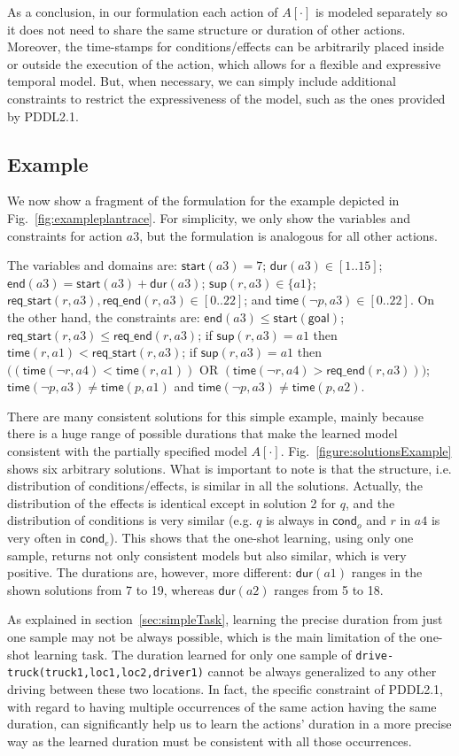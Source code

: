 \documentclass[runningheads]{llncs}
\newcommand{\cond}{\mathsf{cond}}  %
\newcommand{\dur}{\mathsf{dur}}    %
\newcommand{\start}{\mathsf{start}}%
\newcommand{\en}{\mathsf{end}}     %
\newcommand{\supp}{\mathsf{sup}}   %
\newcommand{\tim}{\mathsf{time}}   %
\newcommand{\reqs}{\mathsf{req\_{start}}} %
\newcommand{\reqe}{\mathsf{req\_{end}}}   %
\newcommand{\goal}{\mathsf{goal}}  %
\begin{document}
As a conclusion, in our formulation each action of $A[\cdot]$ is modeled separately so it does not need to share the same structure or duration of other actions. Moreover, the time-stamps for conditions/effects can be arbitrarily placed inside or outside the execution of the action, which allows for a flexible and expressive temporal model. But, when necessary, we can simply include additional constraints to restrict the expressiveness of the model, such as the ones provided by PDDL2.1.


\subsection{Example}
\label{sec:example}

We now show a fragment of the formulation for the example depicted in Fig.~\ref{fig:exampleplantrace}. For simplicity, we only show the variables and constraints for action $a3$, but the formulation is analogous for all other actions.

The variables and domains are: $\start(a3)=7$; $\dur(a3) \in [1..15]$; $\en(a3)=\start(a3)+\dur(a3)$; $\supp(r,a3) \in \{a1\}$; $\reqs(r,a3),\reqe(r,a3) \in [0..22]$; and $\tim(\neg p,a3) \in [0..22]$.
On the other hand, the constraints are: $\en(a3) \leq \start(\goal)$; $\reqs(r,a3) \leq \reqe(r,a3)$; if $\supp(r,a3)=a1$ then $\tim(r,a1) < \reqs(r,a3)$; if $\supp(r,a3)=a1$ then $((\tim(\neg r,a4) < \tim(r,a1))$ OR $(\tim(\neg r,a4) > \reqe(r,a3)))$; $\tim(\neg p,a3) \neq \tim(p,a1)$ and $\tim(\neg p,a3) \neq \tim(p,a2)$.

There are many consistent solutions for this simple example, mainly because there is a huge range of possible durations that make the learned model consistent with the partially specified model $A[\cdot]$.
Fig.~\ref{figure:solutionsExample} shows six arbitrary solutions. What is important to note is that the structure, i.e. distribution of conditions/effects, is similar in all the solutions. Actually, the distribution of the effects is identical except in solution 2 for $q$, and the distribution of conditions is very similar (e.g. $q$ is always in $\cond_o$ and $r$ in $a4$ is very often in $\cond_e$).
This shows that the one-shot learning, using only one sample, returns not only consistent models but also similar, which is very positive.
The durations are, however, more different: $\dur(a1)$ ranges in the shown solutions from 7 to 19, whereas $\dur(a2)$ ranges from 5 to 18.

As explained in section~\ref{sec:simpleTask}, learning the precise duration from just one sample may not be always possible, which is the main limitation of the one-shot learning task. The duration learned for only one sample of \texttt{drive-truck(truck1,loc1,loc2,driver1)} cannot be always generalized to any other driving between these two locations. In fact, the specific constraint of PDDL2.1, with regard to having multiple occurrences of the same action having the same duration, can significantly help us to learn the actions' duration in a more precise way as the learned duration must be consistent with all those occurrences.
\end{document}
